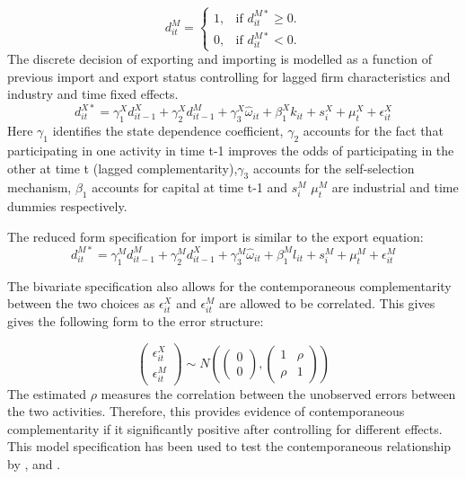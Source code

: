 \documentclass[12pt]{article}
\begin{document}
\begin{equation}
  d_{it}^{M}=\begin{cases}
   1 , & \text{if $d_{it}^{M*} \geq  0$}.\\
   0 , & \text{if $d_{it}^{M*}<  0$}.
  \end{cases}
\end{equation}
The discrete decision of exporting and importing is modelled as a function of previous import and
export status controlling for lagged firm characteristics and industry and time fixed
effects. 
\begin{equation}
d_{it}^{X*} = \gamma_{1}^{X} d_{it-1}^{X} + \gamma_{2}^{X} d_{it-1}^{M}+
\gamma_{3}^{X} \hat{\omega}_{it}  + \beta_{1}^{X}k_{it}  +
s_{i}^{X} + \mu_{t}^{X}  + \epsilon_{it}^{X}
\end{equation}
Here $\gamma_{1}$ identifies the state dependence coefficient, $\gamma_{2}$ accounts for
the fact that participating in one activity in time t-1 improves the
odds of participating in the other at time t (lagged complementarity),$\gamma_{3}$ accounts for
the self-selection mechanism, $\beta_{1}$ accounts for capital at time
t-1 and $s_{i}^{M}$  $\mu_{t}^{M}$ are industrial
and time dummies respectively.

The reduced form specification for import is similar to the export
equation:
\begin{equation}
d_{it}^{M*} = \gamma_{1}^{M} d_{it-1}^{M} + \gamma_{2}^{M} d_{it-1}^{X}+
\gamma_{3}^{M} \hat{\omega}_{it}  + \beta_{1}^{M}l_{it}  +
s_{i}^{M} + \mu_{t}^{M}  + \epsilon_{it}^{M}
\end{equation}

The bivariate specification also allows for the
contemporaneous complementarity between the two choices as
$\epsilon_{it}^{X}$ and $\epsilon_{it}^{M}$ are allowed to be
correlated. This gives gives the following form to the error
structure: 


\[\begin{pmatrix}
\epsilon_{it}^{X} \\
\epsilon_{it}^{M}
\end{pmatrix}\sim N\left(\begin{pmatrix}
0 \\
0
\end{pmatrix},\begin{pmatrix}
1 & \rho \\
\rho & 1
\end{pmatrix}\right)
\]
The estimated $\rho$ measures the correlation between the unobserved
errors between the two activities. Therefore, this provides evidence
of contemporaneous complementarity if it significantly positive after
controlling for different effects. 
This model specification has been used to test the contemporaneous relationship
by \textcite{aristei2013firms}, \textcite{aw2007export} and \textcite{manez2015dynamic}. 
\end{document}
